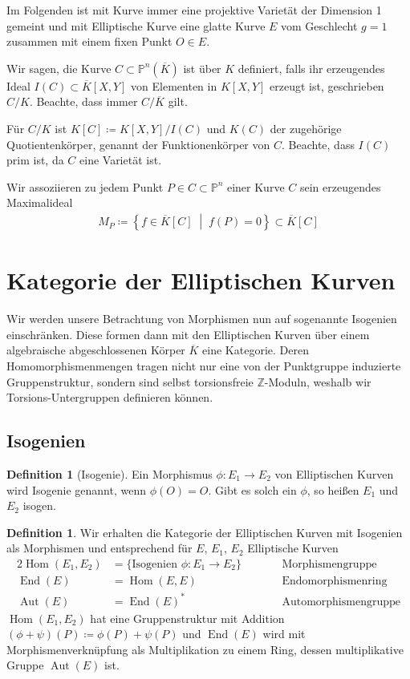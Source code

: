 \documentclass[english, german, parskip=half]{scrartcl}
\theoremstyle{definition}
\newtheorem{Definition}[Satz]{Definition}
\theoremstyle{remark}
\newcommand*{\Z}{\mathds{Z}}
\newcommand*{\K}{\ensuremath{K}} %
\newcommand*{\algK}{\ensuremath{\overline K}} %
\renewcommand*{\P}{\ensuremath{\mathds{P}}} %
\DeclareMathOperator{\Hom}{Hom} %
\DeclareMathOperator{\End}{End} %
\DeclareMathOperator{\Aut}{Aut} %
\begin{document}
Im Folgenden ist mit Kurve immer eine projektive Varietät der
Dimension 1 gemeint und mit Elliptische Kurve eine glatte Kurve $E$ vom
Geschlecht $g=1$ zusammen mit einem fixen Punkt $O\in E$.

Wir sagen, die Kurve $C\subset\P^n(\algK)$ ist über $\K$ definiert,
falls ihr erzeugendes Ideal $I(C)\subset\algK[X,Y]$ von
Elementen in $\K[X,Y]$ erzeugt ist, geschrieben $C/\K$. Beachte, dass
immer $C/\algK$ gilt. 

Für $C/\K$ ist $\K[C]\coloneqq\K[X,Y]/I(C)$ 
und $\K(C)$ der zugehörige Quotientenkörper, genannt
der Funktionenkörper von $C$.
Beachte, dass $I(C)$ prim ist, da $C$ eine Varietät ist.

Wir assoziieren zu jedem Punkt $P\in C\subset\P^n$ einer Kurve $C$
sein erzeugendes Maximalideal 
\begin{gather*}
  M_P\coloneqq\left\{f\in\algK[C]\;\middle\vert\;f(P)=0\right\}
  \subset \algK[C]
\end{gather*}




\section{Kategorie der Elliptischen Kurven}
Wir werden unsere Betrachtung von Morphismen nun auf sogenannte
Isogenien einschränken. Diese formen dann mit den Elliptischen Kurven
über einem algebraische abgeschlossenen Körper $\algK$ eine Kategorie.
Deren Homomorphismenmengen tragen nicht nur eine von der Punktgruppe
induzierte Gruppenstruktur, sondern sind selbst torsionsfreie
$\Z$-Moduln, weshalb wir Torsions-Untergruppen definieren können.


\subsection{Isogenien}
\begin{Definition}[Isogenie]
  Ein Morphismus $\phi\colon E_1\to E_2$ von Elliptischen Kurven wird
  Isogenie genannt, wenn $\phi(O)=O$.
  Gibt es solch ein $\phi$, so heißen $E_1$ und $E_2$ isogen.
\end{Definition}

\begin{Definition}
  Wir erhalten die Kategorie der Elliptischen Kurven mit Isogenien als
  Morphismen und entsprechend für $E$, $E_1$, $E_2$ Elliptische Kurven
  \begin{alignat*}{2}
    \Hom(E_1, E_2)&=\{\text{Isogenien }\phi\colon E_1\to E_2\}
    \qquad&&\text{Morphismengruppe}
    \\
    \End(E)&=\Hom(E,E)
    &&\text{Endomorphismenring}\\
    \Aut(E)&=\End(E)^*
    &&\text{Automorphismengruppe} 
  \end{alignat*}
  $\Hom(E_1, E_2)$ hat eine Gruppenstruktur mit Addition
  $(\phi+\psi)(P)\coloneqq \phi(P)+\psi(P)$ 
  und $\End(E)$ wird mit Morphismenverknüpfung als Multiplikation zu 
  einem Ring, dessen multiplikative Gruppe $\Aut(E)$ ist.
\end{Definition}
\end{document}

